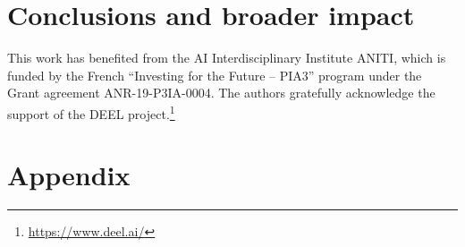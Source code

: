\documentclass{article}
\begin{document}
\section{Conclusions and broader impact}



\begin{ack}
This work has benefited from the AI Interdisciplinary Institute ANITI, which is funded by the French ``Investing for the Future – PIA3'' program under the Grant agreement ANR-19-P3IA-0004. The authors gratefully acknowledge the support of the DEEL project.\footnote{\url{https://www.deel.ai/}}
\end{ack}



%

\newpage

\appendix

\section{Appendix}

\end{document}
